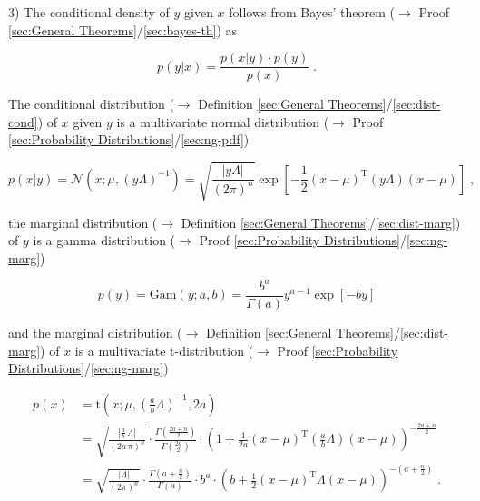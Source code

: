 \documentclass[a4paper,12pt,twoside]{book}
\begin{document}
3) The conditional density of $y$ given $x$ follows from Bayes' theorem ($\rightarrow$ Proof \ref{sec:General Theorems}/\ref{sec:bayes-th}) as

\begin{equation} \label{eq:ng-cond-ng-cond-y-x-s1}
p(y|x) = \frac{p(x|y) \cdot p(y)}{p(x)} \; .
\end{equation}

The conditional distribution ($\rightarrow$ Definition \ref{sec:General Theorems}/\ref{sec:dist-cond}) of $x$ given $y$ is a multivariate normal distribution ($\rightarrow$ Proof \ref{sec:Probability Distributions}/\ref{sec:ng-pdf})

\begin{equation} \label{eq:ng-cond-ng-x-y-pdf}
p(x|y) = \mathcal{N}(x; \mu, (y \Lambda)^{-1}) = \sqrt{\frac{|y \Lambda|}{(2 \pi)^n}} \exp \left[ -\frac{1}{2} (x-\mu)^\mathrm{T} (y \Lambda) (x-\mu) \right] \; ,
\end{equation}

the marginal distribution ($\rightarrow$ Definition \ref{sec:General Theorems}/\ref{sec:dist-marg}) of $y$ is a gamma distribution ($\rightarrow$ Proof \ref{sec:Probability Distributions}/\ref{sec:ng-marg})

\begin{equation} \label{eq:ng-cond-ng-y-pdf}
p(y) = \mathrm{Gam}(y; a, b) = \frac{b^a}{\Gamma(a)} y^{a-1} \exp\left[ -by \right]
\end{equation}

and the marginal distribution ($\rightarrow$ Definition \ref{sec:General Theorems}/\ref{sec:dist-marg}) of $x$ is a multivariate t-distribution ($\rightarrow$ Proof \ref{sec:Probability Distributions}/\ref{sec:ng-marg})

\begin{equation} \label{eq:ng-cond-ng-x-pdf}
\begin{split}
p(x) &= \mathrm{t}\left( x; \mu, \left(\frac{a}{b} \Lambda \right)^{-1}, 2a \right) \\
&= \sqrt{\frac{\left| \frac{a}{b}\,\Lambda \right|}{(2a\,\pi)^n}} \cdot \frac{\Gamma\left( \frac{2a+n}{2} \right)}{\Gamma\left( \frac{2a}{2} \right)} \cdot \left( 1 + \frac{1}{2a} (x-\mu)^\mathrm{T} \left( \frac{a}{b}\Lambda \right) (x-\mu) \right)^{-\frac{2a+n}{2}} \\
&= \sqrt{\frac{|\Lambda|}{(2 \pi)^n}} \cdot \frac{\Gamma\left( a+\frac{n}{2} \right)}{\Gamma(a)} \cdot b^a \cdot \left( b + \frac{1}{2} (x-\mu)^\mathrm{T} \Lambda (x-\mu) \right)^{-\left( a+\frac{n}{2} \right)} \; .
\end{split}
\end{equation}
\end{document}
